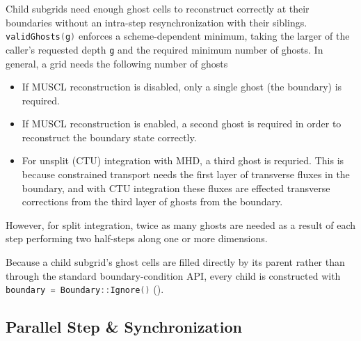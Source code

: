 \documentclass[11pt]{report}
\newcommand{\cpp}[1]{\lstinline[language=C++]{#1}}
\begin{document}
Child subgrids need enough ghost cells to reconstruct correctly at their boundaries without an intra-step resynchronization with their siblings. \cpp{validGhosts(g)} enforces a scheme-dependent minimum, taking the larger of the caller's requested depth \cpp{g} and the required minimum number of ghosts.
In general, a grid needs the following number of ghosts
\begin{itemize}
\item If MUSCL reconstruction is disabled, only a single ghost (the boundary) is required.
\item If MUSCL reconstruction is enabled, a second ghost is required in order to reconstruct the boundary state correctly.
\item For unsplit (CTU) integration with MHD, a third ghost is requried. This is because constrained transport needs the first layer of transverse fluxes in the boundary, and with CTU integration these fluxes are effected transverse corrections from the third layer of ghosts from the boundary.
\end{itemize} 
However, for split integration, twice as many ghosts are needed as a result of each step performing two half-steps along one or more dimensions.

Because a child subgrid's ghost cells are filled directly by its parent rather than through the standard boundary-condition API, every child is constructed with \cpp{boundary = Boundary::Ignore()} ().

\subsection{Parallel Step \& Synchronization}
\end{document}
